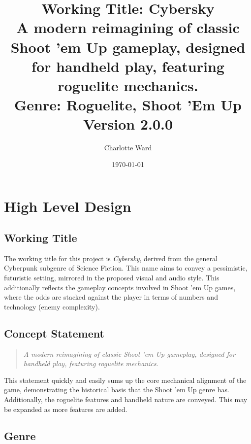 \documentclass{scrartcl}
\begin{document}
\author{Charlotte Ward}
\date{\today}
\title{
{\huge Working Title: Cybersky} \\
{\small A modern reimagining of classic Shoot 'em Up gameplay, designed for handheld play, featuring roguelite mechanics.} \\
{\small Genre: Roguelite, Shoot 'Em Up} \\
{\small Version 2.0.0} %
}
\maketitle

\tableofcontents

\pagebreak

\section{
  High Level Design
 }

\subsection{Working Title}

The working title for this project is \emph{Cybersky}, derived from the general Cyberpunk subgenre of Science Fiction. This name aims to convey a pessimistic, futuristic setting, mirrored in the proposed visual and audio style. This additionally reflects the gameplay concepts involved in Shoot 'em Up games, where the odds are stacked against the player in terms of numbers and technology (enemy complexity).

\subsection{Concept Statement}

\begin{quote}
  \emph{A modern reimagining of classic Shoot 'em Up gameplay, designed for handheld play, featuring roguelite mechanics.}
\end{quote}

This statement quickly and easily sums up the core mechanical alignment of the game, demonstrating the historical basis that the Shoot 'em Up genre has. Additionally, the roguelite features and handheld nature are conveyed. This may be expanded as more features are added.

\subsection{Genre}
\end{document}
